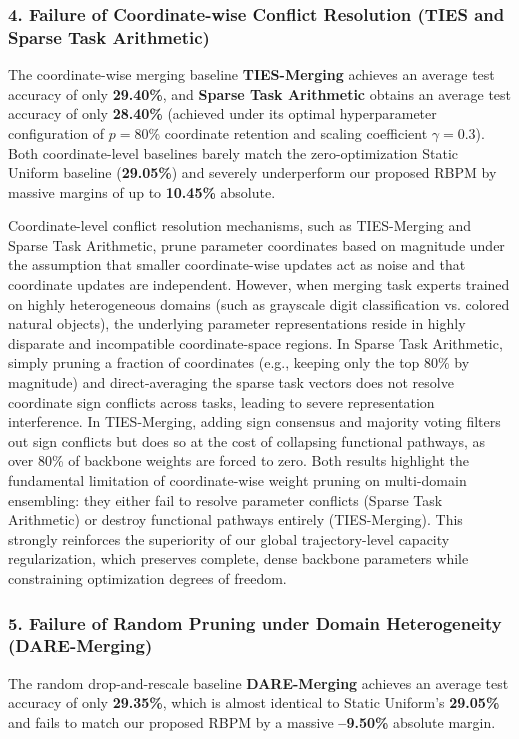 \subsubsection{4. Failure of Coordinate-wise Conflict Resolution (TIES and Sparse Task Arithmetic)}
The coordinate-wise merging baseline \textbf{TIES-Merging} \cite{yadav2023ties} achieves an average test accuracy of only \textbf{29.40\%}, and \textbf{Sparse Task Arithmetic} \cite{drago2024sparse} obtains an average test accuracy of only \textbf{28.40\%} (achieved under its optimal hyperparameter configuration of $p=80\%$ coordinate retention and scaling coefficient $\gamma=0.3$). Both coordinate-level baselines barely match the zero-optimization Static Uniform baseline (\textbf{29.05\%}) and severely underperform our proposed RBPM by massive margins of up to \textbf{10.45\%} absolute.

Coordinate-level conflict resolution mechanisms, such as TIES-Merging and Sparse Task Arithmetic, prune parameter coordinates based on magnitude under the assumption that smaller coordinate-wise updates act as noise and that coordinate updates are independent. However, when merging task experts trained on highly heterogeneous domains (such as grayscale digit classification vs. colored natural objects), the underlying parameter representations reside in highly disparate and incompatible coordinate-space regions. In Sparse Task Arithmetic, simply pruning a fraction of coordinates (e.g., keeping only the top 80\% by magnitude) and direct-averaging the sparse task vectors does not resolve coordinate sign conflicts across tasks, leading to severe representation interference. In TIES-Merging, adding sign consensus and majority voting filters out sign conflicts but does so at the cost of collapsing functional pathways, as over 80\% of backbone weights are forced to zero. Both results highlight the fundamental limitation of coordinate-wise weight pruning on multi-domain ensembling: they either fail to resolve parameter conflicts (Sparse Task Arithmetic) or destroy functional pathways entirely (TIES-Merging). This strongly reinforces the superiority of our global trajectory-level capacity regularization, which preserves complete, dense backbone parameters while constraining optimization degrees of freedom.

\subsubsection{5. Failure of Random Pruning under Domain Heterogeneity (DARE-Merging)}
The random drop-and-rescale baseline \textbf{DARE-Merging} \cite{yu2023dare} achieves an average test accuracy of only \textbf{29.35\%}, which is almost identical to Static Uniform's \textbf{29.05\%} and fails to match our proposed RBPM by a massive \textbf{--9.50\%} absolute margin.

